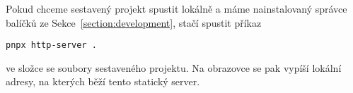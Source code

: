 Pokud chceme sestavený projekt spustit lokálně a máme nainstalovaný správce balíčků ze Sekce~\ref{section:development}, stačí spustit příkaz
\begin{verbatim}
pnpx http-server .
\end{verbatim}
ve složce se soubory sestaveného projektu.
Na obrazovce se pak vypíší lokální adresy, na kterých běží tento statický server.
